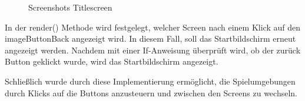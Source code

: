 \begin{figure}[h]
\centering
\qquad
\caption{Screenshots Titlescreen}%
 \label{fig:Screenshots Titlescreen}%
\end{figure}

In der render() Methode wird festgelegt, welcher Screen nach einem Klick auf den imageButtonBack angezeigt wird. In diesem Fall, soll das Startbildschirm erneut angezeigt werden. Nachdem mit einer If-Anweisung überprüft wird, ob der zurück Button geklickt wurde, wird das Startbildschirm angezeigt.  

Schließlich wurde durch diese Implementierung ermöglicht, die Spielumgebungen durch Klicks auf die Buttons anzusteuern und zwischen den Screens zu wechseln. 

